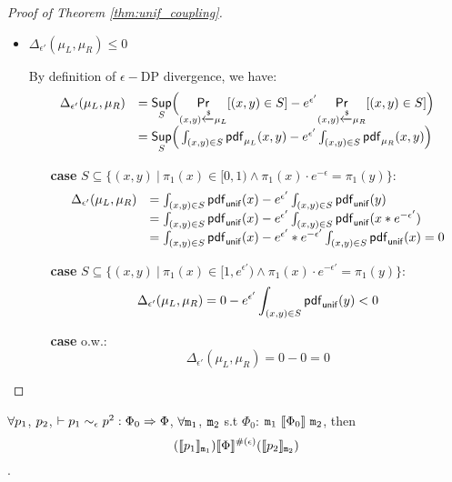\documentclass[a4paper,11pt]{article}
\begin{document}
\begin{proof}[Proof of Theorem \ref{thm:unif_coupling}]
\begin{itemize}
	\item $\Delta_{\epsilon'}(\mu_L, \mu_R) \leq 0$

	By definition of $\epsilon-$DP divergence, we have:
	 \[
	 \begin{array}{ll}
	 \Delta_{\epsilon'}(\mu_L, \mu_R) 
	 & = \underset{S}{\mathsf{Sup}}
	 \Big(
	 \underset{(x,y) \xleftarrow{\$} \mu_L}{\mathsf{Pr}}[(x,y) \in S] - e^{\epsilon'} \underset{(x,y) \xleftarrow{\$} \mu_R}{\mathsf{Pr}}[(x,y) \in S]
	 \Big) \\
	 & =\underset{S}{\mathsf{Sup}}
	 \Big(
	 \int_{(x,y) \in S} \mathsf{pdf}_{\mu_L}(x, y) - e^{\epsilon'} \int_{(x,y) \in S} \mathsf{pdf}_{\mu_R}(x, y)
	 \Big)	 
	 \end{array}
	 \]
	 \begin{itemize}
	 	\item[{\bf case}]
	 	$S \subseteq \{(x, y) ~|~ 
	 	\pi_1(x) \in [0, 1) \land \pi_1(x) \cdot e^{-\epsilon} 
	 	= \pi_1(y)\}$:
		\[
		 \begin{array}{ll}
		 \Delta_{\epsilon'}(\mu_L, \mu_R) 
		 & = 
		 \int_{(x,y) \in S} \mathsf{pdf}_{\mathsf{unif}}(x) - e^{\epsilon'} \int_{(x,y) \in S} \mathsf{pdf}_{\mathsf{unif}}(y)\\
		 & = 
		 \int_{(x,y) \in S} \mathsf{pdf}_{\mathsf{unif}}(x) - e^{\epsilon'} \int_{(x,y) \in S} \mathsf{pdf}_{\mathsf{unif}}(x * e^{-\epsilon'})\\ 
		 & = 
		 \int_{(x,y) \in S} \mathsf{pdf}_{\mathsf{unif}}(x) - e^{\epsilon'}* e^{-\epsilon'} \int_{(x,y) \in S} \mathsf{pdf}_{\mathsf{unif}}(x) 
		 = 0 
		 \end{array}
		 \]
	 	\item[{\bf case}] $S \subseteq \{(x, y) 
	 	~|~ \pi_1(x) \in [1, e^{\epsilon'}) 
	 	\land \pi_1(x) \cdot e^{-\epsilon'} = \pi_1(y)\}$:
		 \[
		 \Delta_{\epsilon'}(\mu_L, \mu_R) 
		 = 
		 0 - e^{\epsilon'} \int_{(x,y) \in S} \mathsf{pdf}_{\mathsf{unif}}(y) <0
		 \]
	 	\item[{\bf case}] o.w.:
		 \[
		 \Delta_{\epsilon'}(\mu_L, \mu_R) = 0 - 0 =  0 
		 \]	 	

	 \end{itemize}

\end{itemize}
\end{proof}
%
%
%
%
%
%
\clearpage
\begin{thm}[Soundness]
 $\forall p_1$, $p_2$,  $ \vdash p_1	
\sim_{\epsilon} 
p^2 :
\Phi_0 \Rightarrow \Phi $,    $\forall \mathtt{m}_1$, $\mathtt{m}_2$ 
s.t $\Phi_0$: 
$\mathtt{m}_1 ~ \llbracket \Phi_0 \rrbracket ~ \mathtt{m}_2$,
then
$$ 
(\llbracket p_1 \rrbracket_{\mathtt{m}_1})  
\llbracket \Phi \rrbracket^{\#(\epsilon)} 
(\llbracket p_2 \rrbracket_{\mathtt{m}_2}) 
$$.
\end{thm}
\end{document}
